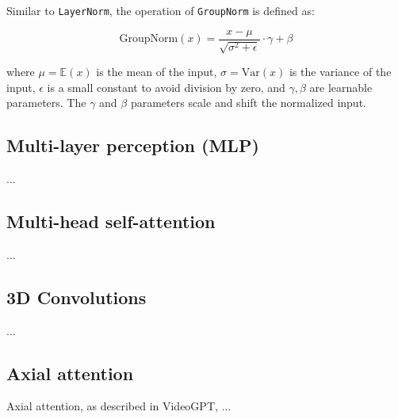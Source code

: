 Similar to \texttt{LayerNorm}, the operation of \texttt{GroupNorm} is defined as:

\begin{equation*}
    \text{GroupNorm}(x) = \frac{x - \mu}{\sqrt{\sigma^2 + \epsilon}} \cdot \gamma + \beta
\end{equation*}

where $\mu = \mathbb{E}(x)$ is the mean of the input, $\sigma = \text{Var} (x)$ is the variance of the input, $\epsilon$ is a small constant to avoid division by zero, and $\gamma, \beta$ are learnable parameters. The $\gamma$ and $\beta$ parameters scale and shift the normalized input.






\subsection{Multi-layer perception (MLP)}

...








\subsection{Multi-head self-attention}

...






\subsection{3D Convolutions}
\label{appendix:blocks_3dconv}

...




\subsection{Axial attention}
\label{appendix:blocks_axial_attention}

Axial attention, as described in VideoGPT, ...